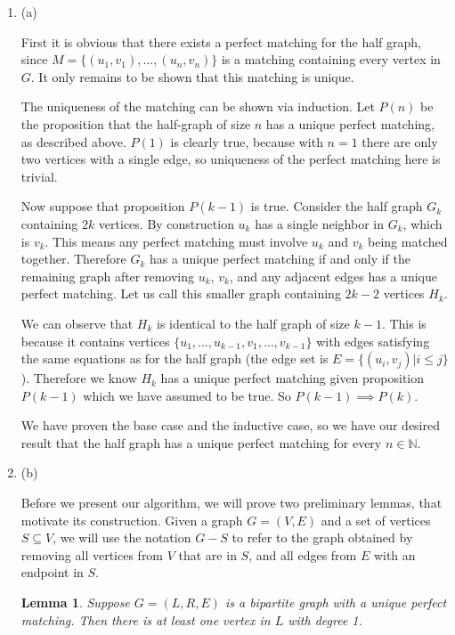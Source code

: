 \documentclass{hmcpset}
\newtheorem{lemma}{Lemma}
\begin{document}
\begin{solution}
\begin{enumerate}
\item (a)

First it is obvious that there exists a perfect matching for the half graph, since
$M = \{(u_1,v_1),\ldots,(u_n,v_n)\}$ is a matching containing every vertex in $G$.
It only remains to be shown that this matching is unique.

The uniqueness of the matching can be shown via induction. Let $P(n)$ be the
proposition that the half-graph of size $n$ has a unique perfect matching,
as described above. $P(1)$ is clearly true, because with $n = 1$ there are only
two vertices with a single edge, so uniqueness of the perfect matching here
is trivial.

Now suppose that proposition $P(k - 1)$ is true. Consider the half graph $G_k$
containing $2k$ vertices. By construction $u_k$ has a single neighbor in $G_k$,
which is $v_k$. This means any perfect matching must involve $u_k$ and $v_k$
being matched together. Therefore $G_k$ has a unique perfect matching if and
only if the remaining graph after removing $u_k$, $v_k$, and any adjacent edges
has a unique perfect matching. Let us call this smaller graph containing
$2k -2$ vertices $H_k$.

We can observe that $H_k$ is identical to the half graph of size $k - 1$. This
is because it contains vertices $\{u_1,\ldots,u_{k-1},v_1,\ldots,v_{k-1}\}$ with
edges satisfying the same equations as for the half graph (the edge set is
$E = \{(u_i, v_j) | i \leq j\}$). Therefore we know $H_k$ has a unique perfect
matching given proposition $P(k - 1)$ which we have assumed to be true.
So $P(k - 1) \implies P(k)$.

We have proven the base case and the inductive case, so we have our desired
result that the half graph has a unique perfect matching for every $n \in \mathbb{N}$.

\item (b)

Before we present our algorithm, we will prove two preliminary lemmas, that motivate
its construction. Given a graph $G = (V, E)$ and a set of vertices $S \subseteq V$,
we will use the notation $G - S$ to refer to the graph obtained by removing all
vertices from $V$ that are in $S$, and all edges from $E$ with an endpoint in $S$.

\begin{lemma}
  Suppose $G = (L, R, E)$ is a bipartite graph with a unique perfect matching. Then
  there is at least one vertex in $L$ with degree 1.
\end{lemma}


\end{enumerate}
\end{solution}
\end{document}

